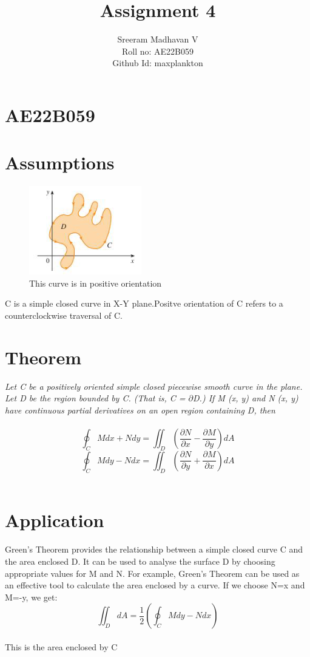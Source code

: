 \documentclass{article}
\title{Assignment 4}
\author{Sreeram Madhavan V\\Roll no: AE22B059\\Github Id: maxplankton}
\date{}
\begin{document}
\maketitle

\section*{AE22B059}
\section*{Assumptions}
\begin{figure}[h!]
    \centering
    \includegraphics{Screenshot from 2023-06-18 01-03-52.png}
    \caption{This curve is in positive orientation}
    \label{fig:enter-label}
\end{figure}
C is a simple closed curve in X-Y plane.Positve orientation of C refers to a counterclockwise traversal of C.
\section*{Theorem}
\emph{Let C be a positively oriented simple closed piecewise smooth
curve in the plane. Let D be the region bounded by C. (That is, C = $\partial$D.) If M (x, y) and N (x, y)
have continuous partial derivatives on an open region containing D, then}\\\\
\begin{equation}
\oint_{C}Mdx+Ndy=\iint_{D}(\frac{\partial N}{\partial x}-\frac{\partial M}{\partial y})dA 
\end{equation}
\begin{equation}
\oint_{C}Mdy-Ndx=\iint_{D}(\frac{\partial N}{\partial y}+\frac{\partial M}{\partial x})dA
\end{equation} ~\cite{singh2022multivariable}
\section*{Application}

Green's Theorem provides the relationship between a simple closed curve C and the area enclosed D.
It can be used to analyse the surface D by choosing appropriate values for M and N. For example, Green's Theorem can be used as an effective tool to calculate the area enclosed by a curve. If we choose N=x and M=-y, we get:\\
\begin{equation}
\iint_{D}dA =\frac{1}{2}(\oint_{C}Mdy-Ndx)
\end{equation}\\
This is the area enclosed by C ~\cite{thomas1952calculus}
\end{document}
